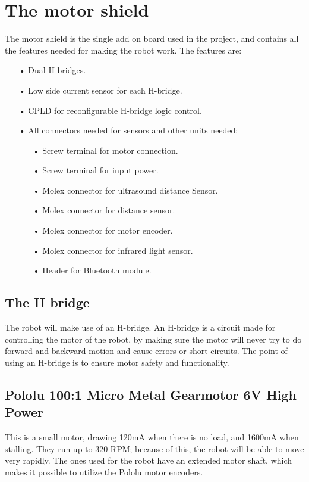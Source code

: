 \section{The motor shield}
The motor shield is the single add on board used in the project, and contains all the features needed for making the robot work.
The features are:
\begin{enumerate}
	\item[•]Dual H-bridges.
	\item[•]Low side current sensor for each H-bridge.
	\item[•]CPLD for reconfigurable H-bridge logic control.
	\item[•]All connectors needed for sensors and other units needed:
	\begin{enumerate}
		\item[•]Screw terminal for motor connection.
		\item[•]Screw terminal for input power.
		\item[•]Molex connector for ultrasound distance Sensor.
		\item[•]Molex connector for  distance sensor.
		\item[•]Molex connector for motor encoder.
		\item[•]Molex connector for infrared light sensor.
		\item[•]Header for Bluetooth module.
	\end{enumerate}
\end{enumerate}

\subsection{The H bridge}
The robot will make use of an H-bridge. An H-bridge is a circuit made for controlling the motor of the robot, by making sure the motor will never try to do forward and backward motion  and cause errors or short circuits. The point of using an H-bridge is to ensure motor safety and functionality.

\subsection{Pololu 100:1 Micro Metal Gearmotor 6V High Power}

This is a small motor, drawing 120mA when there is no load, and 1600mA when stalling. They run up to 320 RPM; because of this, the robot will be able to move very rapidly. The ones used for the robot have an extended motor shaft, which makes it possible to utilize the Pololu motor encoders.

